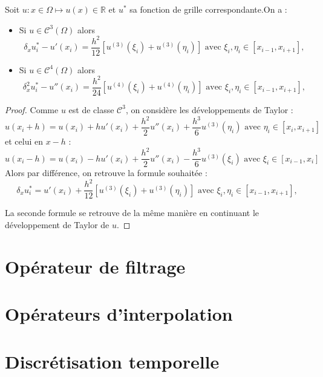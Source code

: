 \begin{proposition}
Soit $u: x \in \Omega \mapsto u(x) \in \mathbb{R}$ et $u^*$ sa fonction de grille correspondante.On a :
\begin{itemize}
\item Si $u \in \mathcal{C}^3 (\Omega)$ alors 
\begin{equation}
\delta_x u^*_i - u'(x_i) = \dfrac{h^2}{12} \left[ u^{(3)}(\xi_i) + u^{(3)}(\eta_i) \right]  \text{ avec } \xi_i , \eta_i \in [x_{i-1}, x_{i+1}],
\end{equation}
\item Si $u \in \mathcal{C}^4 (\Omega)$ alors 
\begin{equation}
\delta^2_x u^*_i - u''(x_i) = \dfrac{h^2}{24} \left[ u^{(4)}(\xi_i) + u^{(4)}(\eta_i) \right]  \text{ avec } \xi_i, \eta_i \in [x_{i-1}, x_{i+1}],
\end{equation}
\end{itemize}
\end{proposition}

\begin{proof}
Comme $u$ est de classe $\mathcal{C}^3$, on considère les développements de Taylor :
\begin{equation}
u(x_i+h) = u(x_i) + h u'(x_i) + \dfrac{h^2}{2} u''(x_i) + \dfrac{h^3}{6} u^{(3)} (\eta_i) \text{ avec } \eta_i \in [x_i, x_{i+1}]
\end{equation}
et celui en $x-h$ :
\begin{equation}
u(x_i-h) = u(x_i) - h u'(x_i) + \dfrac{h^2}{2} u''(x_i) - \dfrac{h^3}{6}u^{(3)}(\xi_i) \text{ avec } \xi_i \in [x_{i-1}, x_{i}]
\end{equation}
Alors par différence, on retrouve la formule souhaitée : 
\begin{equation}
\delta_x u^*_i = u'(x_i) + \dfrac{h^2}{12} \left[ u^{(3)}(\xi_i) + u^{(3)}(\eta_i) \right]  \text{ avec } \xi_i, \eta_i \in [x_{i-1}, x_{i+1}],
\end{equation}

La seconde formule se retrouve de la même manière en continuant le développement de Taylor de $u$.
\end{proof}



















\section{Opérateur de filtrage}


\section{Opérateurs d'interpolation}


\section{Discrétisation temporelle}
